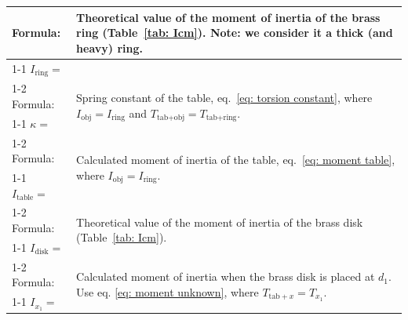 \documentclass[addpoints]{physlabs}
\begin{document}
\begin{postlab}
    \begin{center}
    \renewcommand{\arraystretch}{2.35}
    \captionsetup{font=normalsize}
    \begin{tabular}{|p{8cm}|p{7cm}|}
    \hline
    Formula:                                    & \multirow{2}{7cm}{Theoretical value of the moment of inertia of the brass ring (Table~\ref{tab: Icm}). Note: we consider it a thick (and heavy) ring.}               
    \\
    \cline{1-1}
    $I_\text{ring}=$                             &                                                                                                                                            \\
    \cline{1-2}
    Formula:                                    & \multirow{2}{7cm}{Spring constant of the table, eq.~\ref{eq: torsion constant}, where $I_\text{obj}=I_\text{ring}$ and $T_{\text{tab}+\text{obj}}=T_{\text{tab}+\text{ring}}$.}
    \\
    \cline{1-1}
    $\kappa=$                                         &                                               \\
    \cline{1-2}
    Formula:                                    & \multirow{2}{7cm}{Calculated moment of inertia of the table, eq.~\ref{eq: moment table}, where $I_\text{obj}=I_\text{ring}$.}                           \\
    \cline{1-1}
    $I_\text{table}=$                            &                                               \\
    \cline{1-2}
    Formula:                                    & \multirow{2}{7cm}{Theoretical value of the moment of inertia of the brass disk (Table~\ref{tab: Icm}).}                                              \\
    \cline{1-1}
    $I_\text{disk}=$                             &                                               \\
    \cline{1-2}
    Formula:                                    & \multirow{2}{7cm}{Calculated moment of inertia when the brass disk is placed at $d_1$. Use eq. \ref{eq: moment unknown}, where $T_{\text{tab} + x}=T_{x_1}$.}
    \\
    \cline{1-1}
    $I_{x_1}=$                                   &                                               \\
    \hline

\end{tabular}
\end{center}
\end{postlab}
\end{document}
